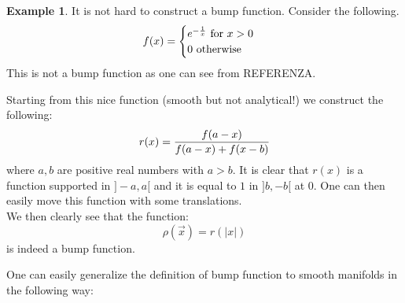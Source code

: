 \documentclass[12pt,a4paper]{report}
\theoremstyle{definition}
\theoremstyle{Theorem}
\theoremstyle{definition}
\newtheorem{Ex}[Def]{Example}
\theoremstyle{definition}
\begin{document}
			\begin{Ex}
				It is not hard to construct a bump function. Consider the following.
				$$f(x)=\begin{cases}
					e^{-{1\over x}} \hbox{ for }x>0\\
					0 \hbox{ otherwise}
				\end{cases}$$
				This is not a bump function as one can see from REFERENZA.
				\begin{center}
				\end{center}
				Starting from this nice function (smooth but not analytical!) we construct the following:
				$$r(x)={f(a-x)\over f(a-x)+f(x-b)}$$
				where $a,b$ are positive real numbers with $a>b$.
				It is clear that $r(x)$ is a function supported in $]-a,a[$ and it is equal to $1$ in $]b,-b[$ at 0. One can then easily move this function with some translations.\\
				We then clearly see that the function:
				$$\rho(\vec{x})=r(|x|)$$ 
				is indeed a bump function.
				\begin{center}
				\end{center}
			\end{Ex}
			One can easily generalize the definition of bump function to smooth manifolds in the following way:
\end{document}

